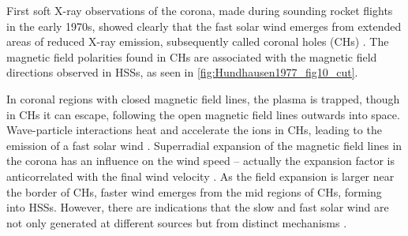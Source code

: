 First soft X-ray observations of the corona, made during sounding rocket flights in the early 1970s, showed clearly that the fast solar wind emerges from extended areas of reduced X-ray emission, subsequently called coronal holes (CHs) \citep{Krieger1973,Hundhausen1977}. The magnetic field polarities found in CHs are associated with the magnetic field directions observed in HSSs, as seen in \autoref{fig:Hundhausen1977_fig10_cut}.
\begin{figure}[htb]
\end{figure}
In coronal regions with closed magnetic field lines, the plasma is trapped, though in CHs it can escape, following the open magnetic field lines outwards into space. Wave-particle interactions heat and accelerate the ions in CHs, leading to the emission of a fast solar wind \citep{Hollweg2002}. Superradial expansion of the magnetic field lines in the corona has an influence on the wind speed -- actually the expansion factor is anticorrelated with the final wind velocity \citep{Wang1990}. As the field expansion is larger near the border of CHs, faster wind emerges from the mid regions of CHs, forming into HSSs. However, there are indications that the slow and fast solar wind are not only generated at different sources but from distinct mechanisms \citep{McGregor2011b}.

